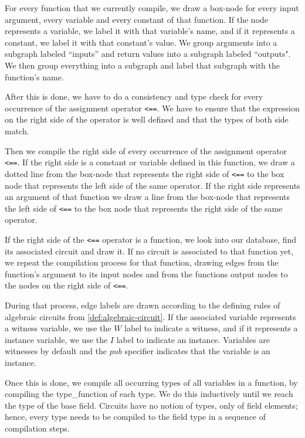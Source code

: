 For every function that we currently compile, we draw a box-node for every input argument, every variable and every constant of that function. If the node represents a variable, we label it with that variable's name, and if it represents a constant, we label it with that constant's value. We group arguments into a subgraph labeled ``inputs'' and return values into a subgraph labeled ``outputs". We then group everything into a subgraph and label that subgraph with the function's name.

After this is done, we have to do a consistency and type check for every occurrence of the assignment operator \texttt{<==}. We have to ensure that the expression on the right side of the operator is well defined and that the types of both side match.

Then we compile the right side of every occurrence of the assignment operator \texttt{<==}. If the right side is a constant or variable defined in this function, we draw a dotted line from the box-node that represents the right side of \texttt{<==} to the box node that represents the left side of the same operator. If the right side represents an argument of that function we draw a line from the box-node that represents the left side of \texttt{<==} to the box node that represents the right side of the same operator. 

If the right side of the \texttt{<==} operator is a function, we look into our database, find its associated circuit and draw it. If no circuit is  associated to that function yet, we repeat the compilation process for that function, drawing edges from the function's argument to its input nodes and from the functions output nodes to the nodes on the right side of \texttt{<==}.

During that process, edge labels are drawn according to the defining rules of algebraic circuits from \ref{def:algebraic-circuit}. If the associated variable represents a witness variable, we use the $W$ label to indicate a witness, and if it represents a instance variable, we use the $I$ label to indicate an instance. Variables are witnesses by default and the $pub$ specifier indicates that the variable is an instance.

Once this is done, we compile all occurring types of all variables in a function, by compiling the type\_function of each type. We do this inductively until we reach the type of the base field. Circuits have no notion of types, only of field elements; hence, every type needs to be compiled to the field type in a sequence of compilation steps.

